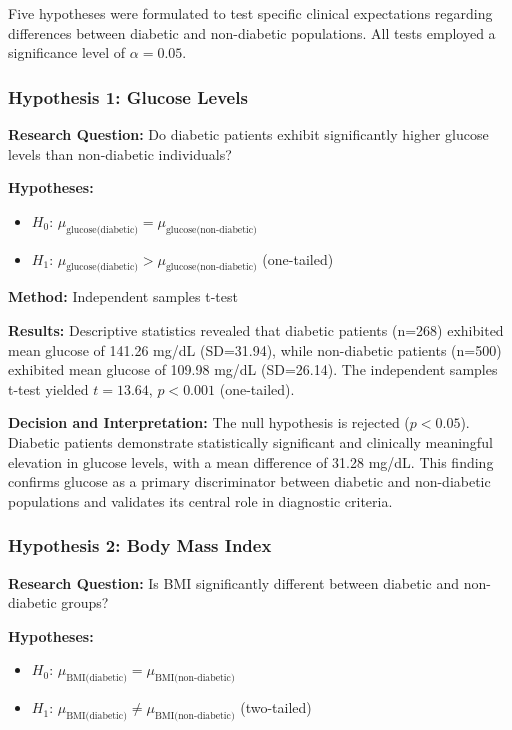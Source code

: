 \documentclass[12pt]{article}
\begin{document}
Five hypotheses were formulated to test specific clinical expectations regarding differences between diabetic and non-diabetic populations. All tests employed a significance level of $\alpha = 0.05$.

\subsubsection{Hypothesis 1: Glucose Levels}

\textbf{Research Question:} Do diabetic patients exhibit significantly higher glucose levels than non-diabetic individuals?

\textbf{Hypotheses:}
\begin{itemize}
    \item $H_0$: $\mu_{\text{glucose(diabetic)}} = \mu_{\text{glucose(non-diabetic)}}$
    \item $H_1$: $\mu_{\text{glucose(diabetic)}} > \mu_{\text{glucose(non-diabetic)}}$ (one-tailed)
\end{itemize}

\textbf{Method:} Independent samples t-test

\textbf{Results:} Descriptive statistics revealed that diabetic patients (n=268) exhibited mean glucose of 141.26 mg/dL (SD=31.94), while non-diabetic patients (n=500) exhibited mean glucose of 109.98 mg/dL (SD=26.14). The independent samples t-test yielded $t = 13.64$, $p < 0.001$ (one-tailed).

\textbf{Decision and Interpretation:} The null hypothesis is rejected ($p < 0.05$). Diabetic patients demonstrate statistically significant and clinically meaningful elevation in glucose levels, with a mean difference of 31.28 mg/dL. This finding confirms glucose as a primary discriminator between diabetic and non-diabetic populations and validates its central role in diagnostic criteria.

\subsubsection{Hypothesis 2: Body Mass Index}

\textbf{Research Question:} Is BMI significantly different between diabetic and non-diabetic groups?

\textbf{Hypotheses:}
\begin{itemize}
    \item $H_0$: $\mu_{\text{BMI(diabetic)}} = \mu_{\text{BMI(non-diabetic)}}$
    \item $H_1$: $\mu_{\text{BMI(diabetic)}} \neq \mu_{\text{BMI(non-diabetic)}}$ (two-tailed)
\end{itemize}
\end{document}
